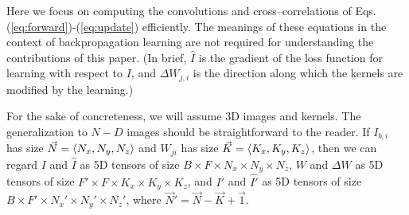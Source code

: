   Here we focus on computing the convolutions and cross--correlations
  of Eqs. (\ref{eq:forward})-(\ref{eq:update}) efficiently.  The
  meanings of these equations in the context of backpropagation
  learning are not required for understanding the contributions of
  this paper.  (In brief, $\hat{I}$ is the gradient of the loss
  function for learning with respect to $I$, and $\Delta W_{j,i}$ is
  the direction along which the kernels are modified by the learning.)



  For the sake of concreteness, we will assume 3D images and
  kernels. The generalization to $N-D$ images should be
  straightforward to the reader.
  If $I_{b,i}$ has size $\vec{N} = \langle N_x, N_y, N_z\rangle$ and
  $W_{ji}$ has size $\vec{K} = \langle K_x,K_y,K_z\rangle$, then we can
  regard $I$ and $\hat{I}$ as 5D tensors of size $B \times F \times N_x
  \times N_y \times N_z$, $W$ and $\Delta W$ as 5D tensors of size $F'
  \times F \times K_x \times K_y \times K_z$, and $I'$ and $\hat{I'}$ as
  5D tensors of size $B \times F' \times N_x' \times N_y' \times N_z'$,
  where $\vec{N}' = \vec{N} - \vec{K} + \vec{1}$.
